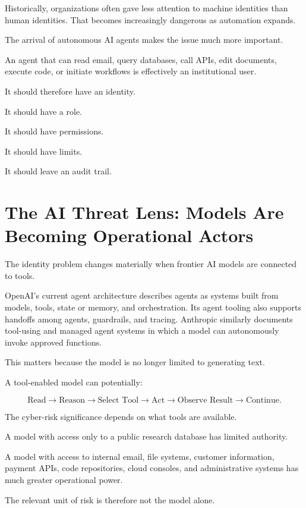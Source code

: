 Historically, organizations often gave less attention to machine identities than human identities. That becomes increasingly dangerous as automation expands.

The arrival of autonomous AI agents makes the issue much more important.

An agent that can read email, query databases, call APIs, edit documents, execute code, or initiate workflows is effectively an institutional user.

It should therefore have an identity.

It should have a role.

It should have permissions.

It should have limits.

It should leave an audit trail.

\section{The AI Threat Lens: Models Are Becoming Operational Actors}

The identity problem changes materially when frontier AI models are connected to tools.

OpenAI's current agent architecture describes agents as systems built from models, tools, state or memory, and orchestration. Its agent tooling also supports handoffs among agents, guardrails, and tracing. Anthropic similarly documents tool-using and managed agent systems in which a model can autonomously invoke approved functions.

This matters because the model is no longer limited to generating text.

A tool-enabled model can potentially:

\begin{equation}
\text{Read}
\rightarrow
\text{Reason}
\rightarrow
\text{Select Tool}
\rightarrow
\text{Act}
\rightarrow
\text{Observe Result}
\rightarrow
\text{Continue}.
\end{equation}

The cyber-risk significance depends on what tools are available.

A model with access only to a public research database has limited authority.

A model with access to internal email, file systems, customer information, payment APIs, code repositories, cloud consoles, and administrative systems has much greater operational power.

The relevant unit of risk is therefore not the model alone.

